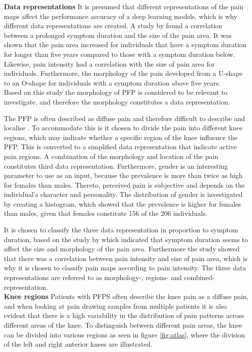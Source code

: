 \noindent
\textbf{Data representations} \newline
It is presumed that different representations of the pain maps affect the performance accuracy of a deep learning models, which is why different data representations are created.
A study by \citeauthor{Boudreau2017} found a correlation between a prolonged symptom duration and the size of the pain area. It was shown that the pain area increased for individuals that have a symptom duration for longer than five years compared to those with a symptom duration below. Likewise, pain intensity had a correlation with the size of pain area for individuals. Furthermore, the morphology of the pain developed from a U-shape to an O-shape for individuals with a symptom duration above five years.\citep{Boudreau2017} \\
Based on this study the morphology of PFP is considered to be relevant to investigate, and therefore the morphology constitutes a data representation.

\noindent
The PFP is often described as diffuse pain and therefore difficult to describe and localise \citep{Witvrouw2014}. To accommodate this is it chosen to divide the pain into different knee regions, which may indicate whether a specific region of the knee influence the PFP. This is converted to a simplified data representation that indicate active pain regions.
A combination of the morphology and location of the pain constitutes third data representation.
\noindent
Furthermore, gender is an interesting parameter to use as an input, because the prevalence is more than twice as high for females than males. Thereto, perceived pain is subjective and depends on the individual's character and personality. The distribution of gender is investigated by creating a histogram, which showed that the prevalence is higher for females than males, given that females constitute 156 of the 206 individuals.

\noindent
It is chosen to classify the three data representation in proportion to symptom duration, based on the study by \citeauthor{Boudreau2017} which indicated that symptom duration seems to affect the size and morphology of the pain area. Furthermore the study showed that there was a correlation between pain intensity and size of pain area, which is why it is chosen to classify pain maps according to pain intensity. The three data representations are referred to as morphology-, regions- and combined-representation.\\

\noindent
\textbf{Knee regions} \newline
\noindent
Patients with PFPS often describe the knee pain as a diffuse pain, and when looking at pain drawing samples from multiple patients it is also evident that there is a high variability in the distribution of pain patterns across different areas of the knee. To distinguish between different pain areas, the knee can be divided into various regions as seen in figure \ref{fig:atlas}, where the division of the left and right anterior knees are illustrated. 

